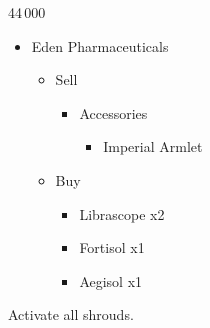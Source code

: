 \begin{multicols}{2}
\begin{shop}{44\,000}
\begin{itemize}
    \item Eden Pharmaceuticals
    \begin{itemize}
        \item Sell
        \begin{itemize}
            \item Accessories
            \begin{itemize}
                \item Imperial Armlet
            \end{itemize}
        \end{itemize}
        \item Buy
        \begin{itemize}
            \item Librascope x2
            \item Fortisol x1
            \item Aegisol x1
        \end{itemize}
    \end{itemize}
\end{itemize}
\end{shop}
\end{multicols}
Activate all shrouds.
\renewcommand{\first}{[1]/[5] Tireless Charge (\com)/\com/\med)}
\renewcommand{\second}{[2]/[4] Aggression (\com/\com/\rav)}
\renewcommand{\third}{[3]/[3] Consolidation (\sen/\sen/\med)}
\renewcommand{\fourth}{[4]/[1] Malevolence (\syn/(\rav)/\rav)}
\renewcommand{\fifth}{[5]/[6] Smart Bomb (\rav/\rav/\sab)}
\renewcommand{\sixth}{[6]/[2] Tri-Disaster (\rav/\rav/\rav)}

